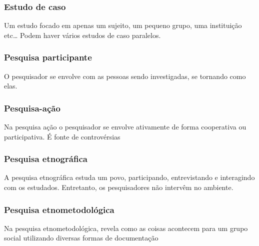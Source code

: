 \subsubsection{Estudo de caso}
Um estudo focado em apenas um sujeito, um pequeno grupo, uma instituição etc… Podem haver vários estudos de caso paralelos.

\subsubsection{Pesquisa participante}
O pesquisador se envolve com as pessoas sendo investigadas, se tornando como elas.

\subsubsection{Pesquisa-ação}
Na pesquisa ação o pesquisador se envolve ativamente de forma cooperativa ou participativa. É fonte de controvérsias

\subsubsection{Pesquisa etnográfica}
A pesquisa etnográfica estuda um povo, participando, entrevistando e interagindo com os estudados. Entretanto, os pesquisadores não intervêm no ambiente.

\subsubsection{Pesquisa etnometodológica}
Na pesquisa etnometodológica, revela como as coisas acontecem para um grupo social utilizando diversas formas de documentação
